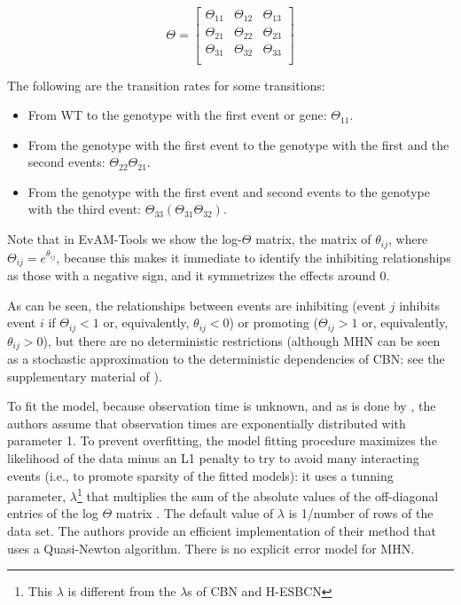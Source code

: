 \documentclass[a4paper,11pt]{article}
\begin{document}
\begin{equation}
  \Theta = 
  \begin{bmatrix}
    \Theta_{11} & \Theta_{12} & \Theta_{13} \\
    \Theta_{21} & \Theta_{22} & \Theta_{23} \\
    \Theta_{31} & \Theta_{32} & \Theta_{33} \\
  \end{bmatrix}
\end{equation}

The following are the transition rates for some transitions:
\begin{itemize}
\item From WT to the genotype with the first event or gene: $\Theta_{11}$.

\item From the genotype with the first event to the genotype with the first and the second events: $\Theta_{22} \Theta_{21}$.
\item From the genotype with the first event and second events to the genotype with the third event: $\Theta_{33} (\Theta_{31} \Theta_{32})$.
\end{itemize}

Note that in EvAM-Tools we show the log-$\Theta$ matrix, the matrix of $\theta_{ij}$, where $\Theta_{ij} = e^{\theta_{ij}}$, because this makes it immediate to identify the inhibiting relationships as those with a negative sign, and it symmetrizes the effects around 0.


As can be seen, the relationships between events are inhibiting (event $j$ inhibits event $i$ if $\Theta_{ij} < 1$ or, equivalently, $\theta_{ij} < 0$) or promoting ($\Theta_{ij} > 1$ or, equivalently, $\theta_{ij} > 0$), but there are no deterministic restrictions (although MHN can be seen as a stochastic approximation to the deterministic dependencies of CBN: see the supplementary material of \citealp{schill2020modelling}).




To fit the model, because observation time is unknown, and as is done by \citet{gerstung2009quantifying}, the authors assume that observation times are exponentially distributed with parameter 1. To prevent overfitting,  the model fitting procedure maximizes the likelihood of the data minus an L1 penalty to try to avoid many interacting events (i.e., to promote sparsity of the fitted models): it uses a tunning parameter, $\lambda$\footnote{This $\lambda$ is different from the $\lambda$s of CBN and H-ESBCN} that multiplies the sum of the absolute values of the off-diagonal entries of the log $\Theta$ matrix \citep[eq.~6]{schill2020modelling}. The default value of $\lambda$ is 1/number of rows of the data set. The authors provide an efficient implementation of their method that uses a Quasi-Newton algorithm. There is no explicit error model for MHN.
\end{document}
